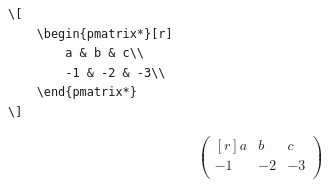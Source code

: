 \begin{frame}[fragile]
    \begin{minipage}{4cm}
        \begin{scriptsize}
            \begin{Verbatim}[frame=single]
\[
    \begin{pmatrix*}[r]
        a & b & c\\
        -1 & -2 & -3\\
    \end{pmatrix*}
\]
            \end{Verbatim}
        \end{scriptsize}
    \end{minipage}
    \begin{minipage}{4cm}
        \[
            \begin{pmatrix*}[r]
                a & b & c\\
                -1 & -2 & -3\\
            \end{pmatrix*}
        \]
    \end{minipage}
\end{frame}

